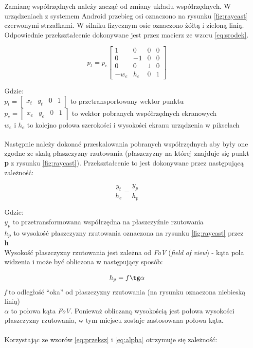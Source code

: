 Zamianę współrzędnych należy zacząć od zmiany układu współrzędnych. W
urządzeniach z systemem Android przebieg osi oznaczono na rysunku
\ref{fig:raycast} czerwonymi strzałkami. W silniku fizycznym osie oznaczono
żółtą i zieloną linią. Odpowiednie przekształcenie dokonywane jest przez macierz
ze wzoru \ref{eq:srodek}.

\begin{equation}p_{t} = 
p_{e}
\begin{bmatrix}1&0&0&0\\0&-1&0&0\\0&0&1&0\\-w_{e}&h_{e}&0&1\end{bmatrix}
\label{eq:srodek}
\end{equation}

Gdzie:\\
$ p_{t} = \begin{bmatrix}x_{t}&y_{t}&0&1\end{bmatrix} $ to przetransportowany
wektor punktu\\
$ p_{e} = \begin{bmatrix}x_{e}&y_{e}&0&1\end{bmatrix} $ to wektor pobranych
współrzędnych ekranowych\\
$ w_{e} $ i $ h_{e} $ to kolejno połowa szerokości i wysokości ekranu urządzenia
w pikselach
\\ \\
Następnie należy dokonać przeskalowania pobranych współrzędnych aby były one
zgodne ze skalą płaszczyzny rzutowania (płaszczyzny na której znajduje się
punkt \textbf{p} z rysunku \ref{fig:raycast}). Przekształcenie to jest
dokonywane przez następującą zależność:

\begin{equation}
\frac{y_{t}}{h_{e}}=\frac{y_{p}}{h_{p}}
\label{eq:przeksz}
\end{equation}

Gdzie:\\
$ y_{p} $ to przetransformowana współrzędna na płaszczyźnie rzutowania\\
$ h_{p} $ to wysokość płaszczyzny rzutowania oznaczona na rysunku
\ref{fig:raycast} przez \textbf{h}\\
Wysokość płaszczyzny rzutowania jest zależna od \emph{FoV} (\emph{field of
view}) - kąta pola widzenia i może być obliczona w następujący sposób:

\begin{equation}
h_{p} = f \tg \alpha
\label{eq:alpha}
\end{equation}
\emph{f} to odległość ``oka'' od płaszczyzny rzutowania (na rysunku oznaczona
niebieską linią)\\
$ \alpha $ to połowa kąta \emph{FoV}. Ponieważ obliczaną wysokością jest połowa
wysokości płaszczyzny rzutowania, w tym miejscu zostaje zastosowana połowa
kąta.\\
\\
Korzystając ze wzorów \ref{eq:przeksz} i \ref{eq:alpha} otrzymuje się zależność:

